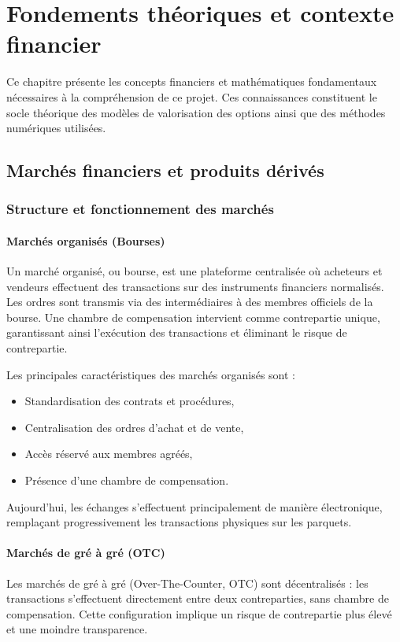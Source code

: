 \chapter{Fondements théoriques et contexte financier}
\label{chap:prerequis}

Ce chapitre présente les concepts financiers et mathématiques fondamentaux nécessaires à la compréhension de ce projet. Ces connaissances constituent le socle théorique des modèles de valorisation des options ainsi que des méthodes numériques utilisées.

\section{Marchés financiers et produits dérivés}
\subsection{Structure et fonctionnement des marchés}

\subsubsection{Marchés organisés (Bourses)}
Un marché organisé, ou bourse, est une plateforme centralisée où acheteurs et vendeurs effectuent des transactions sur des instruments financiers normalisés. Les ordres sont transmis via des intermédiaires à des membres officiels de la bourse. Une chambre de compensation intervient comme contrepartie unique, garantissant ainsi l'exécution des transactions et éliminant le risque de contrepartie.

Les principales caractéristiques des marchés organisés sont :

\begin{itemize}
	\item Standardisation des contrats et procédures,
	\item Centralisation des ordres d'achat et de vente,
	\item Accès réservé aux membres agréés,
	\item Présence d'une chambre de compensation.
\end{itemize}

Aujourd'hui, les échanges s'effectuent principalement de manière électronique, remplaçant progressivement les transactions physiques sur les parquets.

\subsubsection{Marchés de gré à gré (OTC)}
Les marchés de gré à gré (Over-The-Counter, OTC) sont décentralisés : les transactions s'effectuent directement entre deux contreparties, sans chambre de compensation. Cette configuration implique un risque de contrepartie plus élevé et une moindre transparence.

